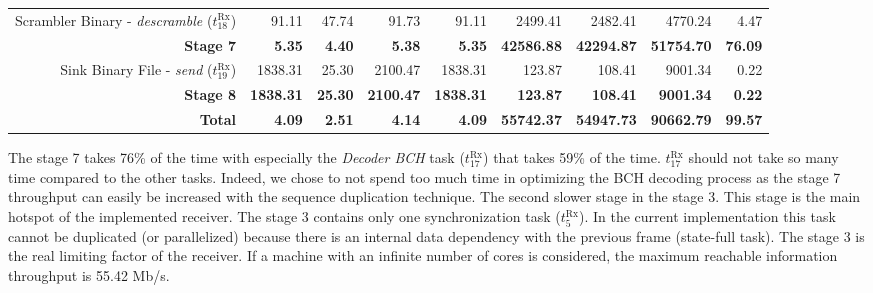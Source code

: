 \begin{table}[htp]
{{\begin{tabular}{r r r r r r r r r}
                               Scrambler Binary -  \emph{descramble} ($t^\text{Rx}_{18}$) &           91.11  &          47.74  &           91.73  &                   91.11  &          2499.41  &          2482.41  &          4770.24  &          4.47  \\
  \rowcolor{Paired-1!15}                                                 \textbf{Stage 7} &    \textbf{5.35} &   \textbf{4.40} &    \textbf{5.38} &            \textbf{5.35} & \textbf{42586.88} & \textbf{42294.87} & \textbf{51754.70} & \textbf{76.09} \\ %
  \addlinespace
                               Sink Binary File -        \emph{send} ($t^\text{Rx}_{19}$) &         1838.31  &          25.30  &         2100.47  &                 1838.31  &           123.87  &           108.41  &          9001.34  &          0.22  \\
                                                                         \textbf{Stage 8} & \textbf{1838.31} &  \textbf{25.30} & \textbf{2100.47} &         \textbf{1838.31} &   \textbf{123.87} &   \textbf{108.41} &  \textbf{9001.34} &  \textbf{0.22} \\ %
  \midrule
                                                                           \textbf{Total} &    \textbf{4.09} &   \textbf{2.51} &    \textbf{4.14} &            \textbf{4.09} & \textbf{55742.37} & \textbf{54947.73} & \textbf{90662.79} & \textbf{99.57} \\ %
  \bottomrule
  \end{tabular}
  }}
\end{table}

The stage 7 takes 76\% of the time with especially the \emph{Decoder BCH} task
($t^\text{Rx}_{17}$) that takes 59\% of the time. $t^\text{Rx}_{17}$ should not
take so many time compared to the other tasks. Indeed, we chose to not spend
too much time in optimizing the BCH decoding process as the stage 7 throughput
can easily be increased with the sequence duplication technique. The second
slower stage in the stage 3. This stage is the main hotspot of the implemented
receiver. The stage 3 contains only one synchronization task
($t^\text{Rx}_{5}$). In the current implementation this task cannot be
duplicated (or parallelized) because there is an internal data dependency with
the previous frame (state-full task). The stage 3 is the real limiting factor of
the receiver. If a machine with an infinite number of cores is considered, the
maximum reachable information throughput is 55.42 Mb/s.

